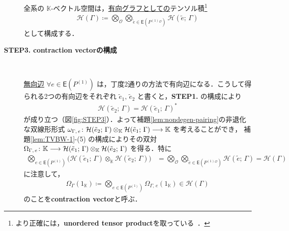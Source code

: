 \documentclass[TQFT_main]{subfiles}
\begin{document}
\begin{description}
    全系の $\mathbb{K}$-ベクトル空間は，\underline{有向グラフとしての}テンソル積\footnote{より正確には，\textbf{unordered tensor product}を取っている~\cite[Appendix E, p.477]{Turaev2017}．}
    \begin{align}
        \mathcal{H}(\Gamma) \coloneqq \bigotimes_{\mathcal{O}} \bigotimes_{\tilde{e} \in \mathsf{E}(P^{(1)}{}^{\mathcal{O}})} \mathcal{H} (\tilde{e};\, \Gamma)
    \end{align}
    として構成する．

    \item[\textbf{STEP3. contraction vectorの構成}]　
    
    \underline{無向辺} $\forall e \in \mathsf{E}(P^{(1)})$ は，丁度2通りの方法で有向辺になる．こうして得られる2つの有向辺をそれぞれ $\tilde{e}_1,\, \tilde{e}_2$ と書くと，\textsf{\textbf{STEP1.}} の構成により
    \begin{align}
        \mathcal{H} (\tilde{e}_2;\, \Gamma) = \mathcal{H} (\tilde{e}_1;\, \Gamma)^*
    \end{align}
    が成り立つ（図\ref{fig:STEP3}）．よって補題\ref{lem:nondegen-pairing}の非退化な双線形形式 $\omega_{\Gamma,\, e} \colon \mathcal{H} (\tilde{e}_2;\, \Gamma) \otimes_{\mathbb{K}} \mathcal{H} (\tilde{e}_1;\, \Gamma) \longrightarrow \mathbb{K}$ を考えることができ，
    補題\ref{lem:TVBW-1}-(5) の構成によりその双対 $\Omega_{\Gamma,\, e} \colon \mathbb{K} \longrightarrow \mathcal{H} (\tilde{e}_1;\, \Gamma) \otimes_{\mathbb{K}} \mathcal{H} (\tilde{e}_2;\, \Gamma)$ を得る．特に
    \begin{align}
        \bigotimes_{e \in \mathsf{E}(P^{(1)})} \bigl( \mathcal{H} (\tilde{e}_1;\, \Gamma) \otimes_{\mathbb{K}} \mathcal{H} (\tilde{e}_2;\, \Gamma)\bigr)
        &= \bigotimes_{\mathcal{O}} \bigotimes_{\tilde{e} \in \mathsf{E}(P^{(1)}{}^{\mathcal{O}})} \mathcal{H} (\tilde{e};\, \Gamma) = \mathcal{H}(\Gamma)
    \end{align}
    に注意して，
    \begin{align}
        \label{eq:contraction}
        \Omega_\Gamma(1_{\mathbb{K}}) \coloneqq \bigotimes_{e \in \mathsf{E}(P^{(1)})} \Omega_{\Gamma,\, e} (1_{\mathbb{K}}) \in \mathcal{H}(\Gamma)
    \end{align}
    のことを\textbf{contraction vector}と呼ぶ．

    \begin{figure}[H]
        \centering
\end{figure}
\end{description}
\end{document}
